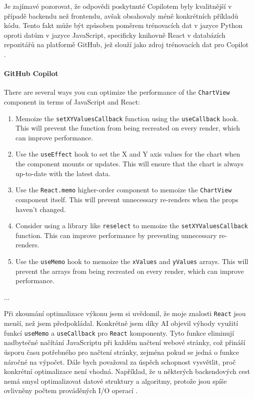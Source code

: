 \documentclass[FM,DP]{tulthesis}
\begin{document}
		Je zajímavé pozorovat, že odpovědi poskytnuté Copilotem byly kvalitnější v případě backendu než frontendu, avšak obsahovaly méně konkrétních příkladů kódu. Tento fakt může být způsoben poměrem trénovacích dat v jazyce Python oproti datům v jazyce JavaScript, specificky knihovně React v databázích repozitářů na platformě GitHub, jež slouží jako zdroj trénovacích dat pro Copilot \cite{gitCopilot}.
		
		\vspace{0.6em}
		\begin{tcolorbox}[colback=white,colframe=black]
			\paragraph{GitHub Copilot}
			There are several ways you can optimize the performance of the \verb|ChartView| component in terms of JavaScript and React:
			\begin{enumerate}
				\item Memoize the \verb|setXYValuesCallback| function using the \verb|useCallback| hook. This will prevent the function from being recreated on every render, which can improve performance.
				\item Use the \verb|useEffect| hook to set the X and Y axis values for the chart when the component mounts or updates. This will ensure that the chart is always up-to-date with the latest data.
				\item Use the \verb|React.memo| higher-order component to memoize the \verb|ChartView| component itself. This will prevent unnecessary re-renders when the props haven't changed.
				\item Consider using a library like \verb|reselect| to memoize the \verb|setXYValuesCallback| function. This can improve performance by preventing unnecessary re-renders.
				\item Use the \verb|useMemo| hook to memoize the \verb|xValues| and \verb|yValues| arrays. This will prevent the arrays from being recreated on every render, which can improve performance.
			\end{enumerate}
			... \cite{refactoring_simple}
		\end{tcolorbox}
		
		Při zkoumání optimalizace výkonu jsem si uvědomil, že moje znalosti \verb|React| jsou menší, než jsem předpokládal. Konkrétně jsem díky AI objevil výhody využití funkcí \verb|useMemo| a \verb|useCallback| pro \verb|React| komponenty. Tyto funkce eliminují nadbytečné načítání JavaScriptu při každém načtení webové stránky, což přináší úsporu času potřebného pro načtení stránky, zejména pokud se jedná o funkce náročné na výpočet. Dále bych považoval za úspěch schopnost vysvětlit, proč konkrétní optimalizace není vhodná. Například, že u některých backendových cest nemá smysl optimalizovat datové struktury a algoritmy, protože jsou spíše ovlivněny počtem prováděných I/O operací \cite{react} \cite{bottlenecks}.
		
\end{document}
